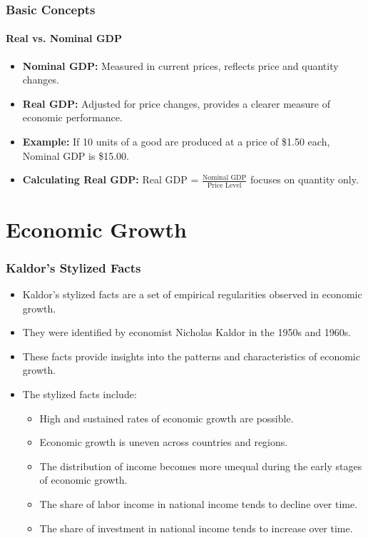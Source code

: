 \documentclass{beamer}
\begin{document}
        
        \begin{frame}
            \frametitle{Basic Concepts}
            \framesubtitle{Real vs. Nominal GDP}
                \begin{itemize}
                    \item \textbf{Nominal GDP:} Measured in current prices, reflects price and quantity changes.
                    \item \textbf{Real GDP:} Adjusted for price changes, provides a clearer measure of economic performance.
                    \item \textbf{Example:} If 10 units of a good are produced at a price of \$1.50 each, Nominal GDP is \$15.00.
                    \item \textbf{Calculating Real GDP:} Real GDP = $\frac{\text{Nominal GDP}}{\text{Price Level}}$ focuses on quantity only.
                \end{itemize}
            \end{frame}
            
\section{Economic Growth}
\begin{frame}
\frametitle{Kaldor's Stylized Facts}
\begin{itemize}
    \item Kaldor's stylized facts are a set of empirical regularities observed in economic growth.
    \item They were identified by economist Nicholas Kaldor in the 1950s and 1960s.
    \item These facts provide insights into the patterns and characteristics of economic growth.
    \item The stylized facts include:
    \begin{itemize}
        \item High and sustained rates of economic growth are possible.
        \item Economic growth is uneven across countries and regions.
        \item The distribution of income becomes more unequal during the early stages of economic growth.
        \item The share of labor income in national income tends to decline over time.
        \item The share of investment in national income tends to increase over time.
    \end{itemize}
\end{itemize}
\end{frame}
\end{document}
